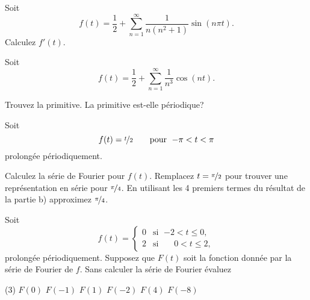 \begin{exercise}
Soit
\begin{equation*}
f(t) = \frac{1}{2} + \sum_{n=1}^\infty
\frac{1}{n(n^2+1)}
\sin(n\pi t) .
\end{equation*}
Calculez $f'(t)$.
\end{exercise}

\begin{exercise}
Soit
\begin{equation*}
f(t) = \frac{1}{2} + \sum_{n=1}^\infty
\frac{1}{n^3}
\cos(n t) .
\end{equation*}
\begin{tasks}
\task Trouvez la primitive.
\task La primitive est-elle périodique?
\end{tasks}
\end{exercise}

\begin{exercise}
Soit
\begin{equation*}
f(t) = \nicefrac{t}{2} \qquad \text{pour } \; {-\pi} < t < \pi
\end{equation*}
prolongée périodiquement.
\begin{tasks}
\task Calculez la série de Fourier pour $f(t)$.
\task Remplacez $t=\nicefrac{\pi}{2}$ pour trouver une représentation en série
pour $\nicefrac{\pi}{4}$.
\task En utilisant les 4 premiers termes du résultat de la partie b) approximez
$\nicefrac{\pi}{4}$.
\end{tasks}
\end{exercise}

\begin{exercise}
Soit
\begin{equation*}
f(t) = 
\begin{cases}
0 & \text{si } \; {-2} < t \leq 0, \\
2 & \text{si } \; \phantom{-}0 < t \leq 2,
\end{cases}
\end{equation*}
prolongée périodiquement.  Supposez que  $F(t)$ soit la fonction donnée
par la série de Fourier de $f$.  Sans calculer la série de Fourier
évaluez
\begin{tasks}(3)
\task $F(0)$
\task $F(-1)$
\task $F(1)$
\task $F(-2)$
\task $F(4)$
\task $F(-8)$
\end{tasks}
\end{exercise}

